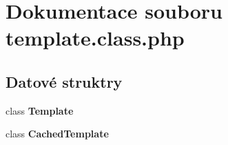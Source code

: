 \section{Dokumentace souboru template.class.php}
\label{template_8class_8php}
\subsection*{Datové struktry}
\begin{CompactItemize}
\item 
class {\bf Template}
\item 
class {\bf CachedTemplate}
\end{CompactItemize}
